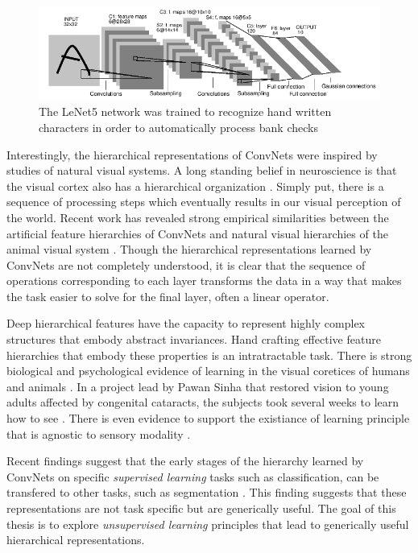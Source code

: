\begin{figure} 
\centering
\includegraphics[scale=0.5]{./figures/introduction/lenet5.png} 
\caption{The LeNet5 network was trained to recognize hand written characters in order to 
automatically process bank checks} 
\label{fig:LeNet5} 
\end{figure}  

Interestingly, the hierarchical representations of ConvNets were inspired by
studies of natural visual systems. A long standing belief in neuroscience is
that the visual cortex also has a hierarchical organization
\cite{hubel1968,felleman1991}. Simply put, there is a sequence of processing
steps which eventually results in our visual perception of the world. Recent
work has revealed strong empirical similarities between the artificial feature
hierarchies of ConvNets and natural visual hierarchies of the animal visual
system \cite{yamins2014}. Though the hierarchical representations learned by
ConvNets are not completely understood, it is clear that the sequence of
operations corresponding to each layer transforms the data in a way that makes
the task easier to solve for the final layer, often a linear operator.    

Deep hierarchical features have the capacity to represent highly complex
structures that embody abstract invariances. Hand crafting effective feature
hierarchies that embody these properties is an intratractable task. There is
strong biological and psychological evidence of learning in the visual
coretices of humans and animals \cite{foldiak1991,sinha2013}. In a project lead by    
Pawan Sinha that restored vision to young adults affected by congenital cataracts, 
the subjects took several weeks to learn how to see \cite{sinha2013}. There is even
evidence to support the existiance of learning principle that is agnostic to
sensory modality \cite{sharma2000}.   

Recent findings suggest that the early stages of the hierarchy learned by ConvNets 
on specific \emph{supervised learning} tasks such as classification, can be transfered 
to other tasks, such as segmentation \cite{yosinski2014}. This finding suggests 
that these representations are not task specific but are generically useful. 
The goal of this thesis is to explore \emph{unsupervised learning} principles that lead
to generically useful hierarchical representations.    

